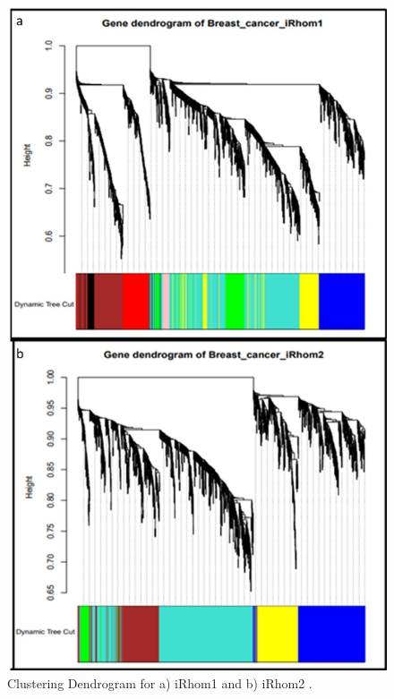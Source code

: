 \documentclass[fleqn,10pt,lineno]{wlpeerj}
\begin{document}
\begin{figure}[ht]
\centering
\includegraphics[width=\linewidth]{gene-dendo.jpg}
\caption{Clustering Dendrogram for a) iRhom1 and b) iRhom2 .}
\label{fig:gene-dendo}
\end{figure}
\end{document}
